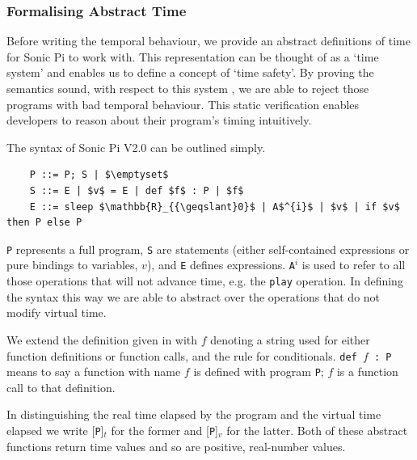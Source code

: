 \documentclass[11pt, abstracton, twoside, titlepage=true]{scrartcl}
\begin{document}
\subsubsection{Formalising Abstract Time} \label{abstractTime}
Before writing the temporal behaviour, we provide an abstract definitions of time 
for Sonic Pi to work with. This representation can be thought of as a `time system' 
and enables us to define a concept of `time safety'. By proving the semantics sound, 
with respect to this system \cite{AOB14}, we are able to reject those programs with 
bad temporal behaviour. This static verification enables developers to reason about 
their program's timing intuitively.

The syntax of Sonic Pi V2.0 can be outlined simply.
\\
\begin{lstlisting}
	P ::= P; S | $\emptyset$
	S ::= E | $v$ = E | def $f$ : P | $f$
	E ::= sleep $\mathbb{R}_{{\geqslant}0}$ | A$^{i}$ | $v$ | if $v$ then P else P
\end{lstlisting}

\texttt{P} represents a full program, 
\texttt{S} are statements (either self-contained expressions or pure bindings 
to variables, $v$), and \texttt{E} defines expressions. \texttt{A$^{i}$} is used to 
refer to all those operations that will not advance time, e.g. the 
\texttt{play} operation. In defining the syntax this way we are able to abstract 
over the operations that do not modify virtual time.

We extend the definition given in \cite{AOB14} with $f$ denoting a string used for 
either function definitions or function calls, and the rule for conditionals. 
\texttt{def $f$ : P} means to say a function with name $f$ is defined with program 
\texttt{P}; $f$ is a function call to that definition.

In distinguishing the real time elapsed by the program and the virtual time elapsed 
we write [\texttt{P}]$_{t}$ for the former and [\texttt{P}]$_{v}$ for the latter. 
Both of these abstract functions return time values and so are positive, 
real-number values.
\end{document}
